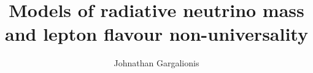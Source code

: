 \title{Models of radiative neutrino mass and lepton flavour non-universality}

\author{Johnathan Gargalionis}



